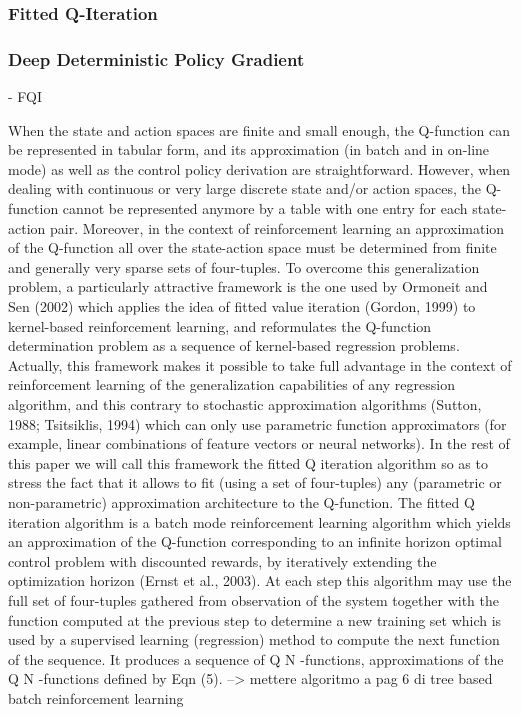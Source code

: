 \subsubsection{Fitted Q-Iteration}

\subsubsection{Deep Deterministic Policy Gradient}





















- FQI

	When the state and action spaces are finite and small enough, the Q-function can be represented in tabular form, and its approximation (in batch and in on-line mode) as well as the control policy derivation are straightforward. However, when dealing with continuous or very large discrete state and/or action spaces, the Q-function cannot be represented anymore by a table with one entry for each state-action pair. Moreover, in the context of reinforcement learning an approximation of the Q-function all over the state-action space must be determined from finite and generally very sparse sets of four-tuples.
To overcome this generalization problem, a particularly attractive framework is the one used by Ormoneit and Sen (2002) which applies the idea of fitted value iteration (Gordon, 1999) to kernel-based reinforcement learning, and reformulates the Q-function determination problem as a sequence of kernel-based regression problems. Actually, this framework makes it possible to take full advantage in the context of reinforcement learning of the generalization capabilities of any regression algorithm, and this contrary to stochastic approximation algorithms (Sutton, 1988; Tsitsiklis, 1994) which can only use parametric function approximators (for example, linear combinations of feature vectors or neural networks). In the rest of this paper we will call this framework the fitted Q iteration
algorithm so as to stress the fact that it allows to fit (using a set of four-tuples) any (parametric or non-parametric) approximation architecture to the Q-function.
The fitted Q iteration algorithm is a batch mode reinforcement learning algorithm which yields an approximation of the Q-function corresponding to an infinite horizon optimal control problem with discounted rewards, by iteratively extending the optimization horizon (Ernst et al., 2003).
At each step this algorithm may use the full set of four-tuples gathered from observation of the system together with the function computed at the previous step to determine a new training set which is used by a supervised learning (regression) method to compute the next function of the sequence. It produces a sequence of Q N -functions, approximations of the Q N -functions defined by Eqn (5). --> mettere algoritmo a pag 6 di tree based batch reinforcement learning

